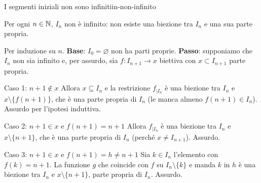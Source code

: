 \begin{concetto}
\begin{Teorema}{I segmenti iniziali non sono infiniti}{in-non-infinito}
    \begin{prerequisiti}
    \end{prerequisiti}
    Per ogni $n \in \mathbb{N}$, $I_n$ non è infinito: non esiste una biezione tra $I_n$ e una sua parte propria.
\end{Teorema}
\begin{dimostrazione}
    Per induzione su $n$. \textbf{Base}: $I_0 = \varnothing$ non ha parti proprie. \textbf{Passo}: supponiamo che $I_n$ non sia infinito e,
    per assurdo, sia $f \colon I_{n + 1} \to x$ biettiva con $x \subset I_{n + 1}$ parte propria.
    \begin{caso}{Caso 1: $n + 1 \notin x$}
        Allora $x \subseteq I_n$ e la restrizione $f_{|I_n}$ è una biezione tra $I_n$ e $x \setminus \{f(n + 1)\}$, che è una parte propria di $I_n$
        (le manca almeno $f(n + 1) \in I_n$). Assurdo per l'ipotesi induttiva.
    \end{caso}
    \begin{caso}{Caso 2: $n + 1 \in x$ e $f(n + 1) = n + 1$}
        Allora $f_{|I_n}$ è una biezione tra $I_n$ e $x \setminus \{n + 1\}$, che è una parte propria di $I_n$ (perché $x \neq I_{n + 1}$). Assurdo.
    \end{caso}
    \begin{caso}{Caso 3: $n + 1 \in x$ e $f(n + 1) = h \neq n + 1$}
        Sia $k \in I_n$ l'elemento con $f(k) = n + 1$. La funzione $g$ che coincide con $f$ su $I_n \setminus \{k\}$ e manda $k$ in $h$ è una
        biezione tra $I_n$ e $x \setminus \{n + 1\}$, parte propria di $I_n$. Assurdo.
    \end{caso}
\end{dimostrazione}
\end{concetto}


